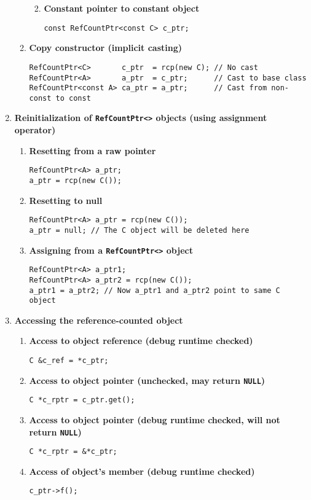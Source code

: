 \documentclass[pdf,ps2pdf,11pt]{SANDreport}
\begin{document}
\begin{enumerate}
\begin{enumerate}
\begin{enumerate}
{\begin{verbatim}
\end{verbatim}}
%
\item {\bf Constant pointer to constant object }
{\small\begin{verbatim}
const RefCountPtr<const C> c_ptr;
\end{verbatim}}
%
\end{enumerate}
%
\item {\bf Copy constructor (implicit casting)}
%
{\small\begin{verbatim}
RefCountPtr<C>       c_ptr  = rcp(new C); // No cast
RefCountPtr<A>       a_ptr  = c_ptr;      // Cast to base class
RefCountPtr<const A> ca_ptr = a_ptr;      // Cast from non-const to const
\end{verbatim}}
%
\end{enumerate}

\item {\bf Reinitialization of \texttt{RefCountPtr<>} objects (using assignment operator)}
%
\begin{enumerate}
%
\item {\bf Resetting from a raw pointer}
%
{\small\begin{verbatim}
RefCountPtr<A> a_ptr;
a_ptr = rcp(new C());
\end{verbatim}}
%
\item {\bf Resetting to null}
%
{\small\begin{verbatim}
RefCountPtr<A> a_ptr = rcp(new C());
a_ptr = null; // The C object will be deleted here
\end{verbatim}}
%
\item {\bf Assigning from a \texttt{RefCountPtr<>} object}
%
{\small\begin{verbatim}
RefCountPtr<A> a_ptr1;
RefCountPtr<A> a_ptr2 = rcp(new C());
a_ptr1 = a_ptr2; // Now a_ptr1 and a_ptr2 point to same C object
\end{verbatim}}
%
\end{enumerate}

\item {\bf Accessing the reference-counted object}
%
\begin{enumerate}
%
\item {\bf Access to object reference (debug runtime checked)}
%
{\small\begin{verbatim}
C &c_ref = *c_ptr;
\end{verbatim}}
%
\item {\bf Access to object pointer (unchecked, may return \texttt{NULL})}
%
{\small\begin{verbatim}
C *c_rptr = c_ptr.get();
\end{verbatim}}
%
\item {\bf Access to object pointer (debug runtime checked, will not return \texttt{NULL})}
%
{\small\begin{verbatim}
C *c_rptr = &*c_ptr;
\end{verbatim}}
%
\item {\bf Access of object's member (debug runtime checked)}
%
{\small\begin{verbatim}
c_ptr->f();
\end{verbatim}}
%
\end{enumerate}


\end{enumerate}
\end{document}
